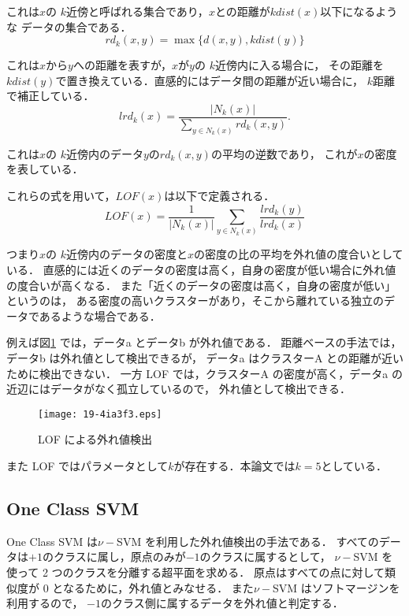 \documentclass[japanese]{jnlp_1.4}
\begin{document}
これは\( x \)の \( k \)近傍と呼ばれる集合であり，\( x \)との距離が\( kdist(x) \)以下になるような
データの集合である．
\[
rd_{k}(x,y) = \max \{ d(x,y), kdist(y) \}
\]

これは\( x \)から\( y \)への距離を表すが，\( x \)が\( y \)の \( k \)近傍内に入る場合に，
その距離を\( kdist(y) \)で置き換えている．直感的にはデータ間の距離が近い場合に，
\( k \)距離で補正している．
\[
lrd_{k}(x) = \frac{|N_{k}(x)|}{\sum_{y \in N_{k}(x)} rd_{k}(x,y)}.
\]

これは\( x \)の \( k \)近傍内のデータ\( y \)の\( rd_{k}(x,y) \)の平均の逆数であり，
これが\( x \)の密度を表している．

これらの式を用いて，\( LOF(x) \)は以下で定義される．
\[
LOF(x) = \frac{1}{|N_{k}(x)|} \sum_{y \in N_{k}(x)} \frac{lrd_{k}(y)}{lrd_{k}(x)}
\]

つまり\( x \)の \( k \)近傍内のデータの密度と\( x \)の密度の比の平均を外れ値の度合いとしている．
直感的には近くのデータの密度は高く，自身の密度が低い場合に外れ値の度合いが高くなる．
また「近くのデータの密度は高く，自身の密度が低い」というのは，
ある密度の高いクラスターがあり，そこから離れている独立のデータであるような場合である．

例えば図\ref{lof-ex} では，データa とデータb が外れ値である． 
距離ベースの手法では，データb は外れ値として検出できるが，
データa はクラスターA との距離が近いために検出できない．
一方 LOF では，クラスターA の密度が高く，データa の近辺にはデータがなく孤立しているので，
外れ値として検出できる．

\begin{figure}[t]
\begin{center}
\texttt{[image: 19-4ia3f3.eps]}
\end{center}
\caption{LOF による外れ値検出}
\label{lof-ex}
\end{figure} 

また LOF ではパラメータとして\( k \)が存在する．本論文では\( k = 5\)としている．


\subsection{One Class SVM}

One Class SVM は\(\nu-\)SVM \cite{oc-svm}を利用した外れ値検出の手法である\cite{akaho}．
すべてのデータは\( +1 \)のクラスに属し，原点のみが\( -1 \)のクラスに属するとして，
\(\nu-\)SVM を使って 2 つのクラスを分離する超平面を求める．
原点はすべての点に対して類似度が 0 となるために，外れ値とみなせる．
また\(\nu-\)SVM はソフトマージンを利用するので，
\( -1 \)のクラス側に属するデータを外れ値と判定する．
\end{document}
